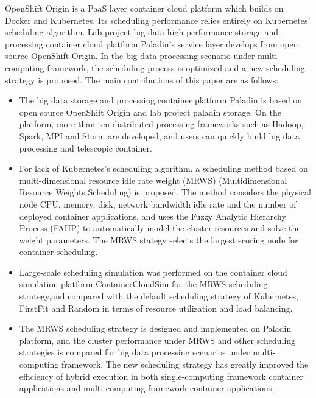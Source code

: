 \begin{eabstract}
OpenShift Origin is a PaaS layer container cloud platform which builds on Docker and Kubernetes. Its scheduling performance relies entirely on Kubernetes' scheduling algorithm. Lab project big data high-performance storage and processing container cloud platform Paladin's service layer develops from open source OpenShift Origin. In the big data processing scenario under multi-computing framework, the scheduling process is optimized and a new scheduling strategy is proposed. The main contributions of this paper are as follows:
\begin{itemize}
	\item The big data storage and processing container platform Paladin is based on open source OpenShift Origin and lab project paladin storage. On the platform, more than ten distributed processing frameworks such as Hadoop, Spark, MPI and Storm are developed, and users can quickly build big data processing and telescopic container.
	\item For lack of Kubernetes's scheduling algorithm, a scheduling method based on multi-dimensional resource idle rate weight (MRWS) (Multidimensional Resource Weights Scheduling) is proposed. The method considers the physical node CPU, memory, disk, network bandwidth idle rate and the number of deployed container applications, and uses the Fuzzy Analytic Hierarchy Process (FAHP) to automatically model the cluster resources and solve the weight parameters. The MRWS stategy selects the largest scoring node for container scheduling.
	\item Large-scale scheduling simulation was performed on the container cloud simulation platform ContainerCloudSim for the MRWS scheduling strategy,and compared with the default scheduling strategy of Kubernetes, FirstFit and Random in terms of resource utilization and load balancing.
	\item The MRWS scheduling strategy is designed and implemented on Paladin platform, and the cluster performance under MRWS and other scheduling strategies is compared for big data processing scenarios under multi-computing framework. The new scheduling strategy has greatly improved the efficiency of hybrid execution in both single-computing framework container applications and multi-computing framework container applications.
\end{itemize}
  
\end{eabstract}











